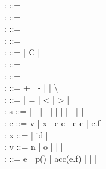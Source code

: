 \documentclass {llncs}
\begin{document}
\begin{plstx}
:  ::=  \\
:  ::=  \\
:  ::=  \\
:  ::=  \\
:  ::= \Tint | C | \top \\
:  ::=  \\
:  ::= \contract{\sphi}{\sphi} \\
: \oplus ::= + | - | \ast | \backslash \\
: \odot ::= \neq | = | < | > | \leq | \geq \\
: s ::= \sSkip |  |  |  |  |  |  |  |  | \sAssert{\phi} |  |  \\
: e ::= v | x | e \oplus e | e \odot e | e.f \\
: x ::= \eresult | id |  | \ethis \\
: v ::= n | o | \enull | \phiTrue | \phiFalse \\
: \phi ::= e | p() | acc(e.f) | \phi \wedge \phi | \phi \ast \phi |  | \\
\end{plstx}
\end{document}
